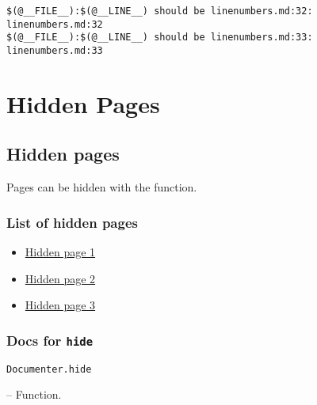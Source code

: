 \begin{lstlisting}[]
$(@__FILE__):$(@__LINE__) should be linenumbers.md:32: linenumbers.md:32
$(@__FILE__):$(@__LINE__) should be linenumbers.md:33: linenumbers.md:33
\end{lstlisting}



\part{Hidden Pages}


\chapter{Hidden pages}



\label{17674588485938683954}{}


Pages can be hidden with the  function.



\section{List of hidden pages}



\label{11617838668139858457}{}


\begin{itemize}
\item \href{hidden{\textbackslash}x.md}{Hidden page 1}


\item \href{hidden{\textbackslash}y.md}{Hidden page 2}


\item \href{hidden{\textbackslash}z.md}{Hidden page 3}

\end{itemize}


\section{Docs for \texttt{hide}}



\label{1400566111489432392}{}

\hypertarget{12333874902364664348}{\texttt{Documenter.hide}}  -- {Function.}

